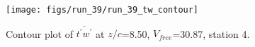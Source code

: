 \begin{figure}[H]
\centering
\texttt{[image: figs/run\_39/run\_39\_tw\_contour]}
\caption{Contour plot of $\overline{t^\prime w^\prime}$ at $z/c$=8.50, $V_{free}$=30.87, station 4.}
\label{fig:run_39_tw_contour}
\end{figure}


